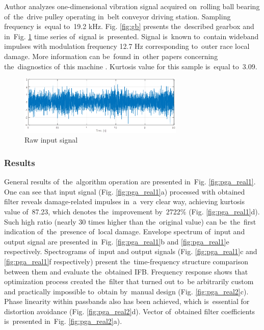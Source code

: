 Author analyzes one-dimensional vibration signal acquired on~rolling ball bearing of~the~drive pulley operating in~belt conveyor driving station. Sampling frequency is~equal to~19.2 kHz. Fig. \ref{fig:gb} presents the~described gearbox and in~Fig. \ref{fig:pga_raw} time series of~signal is~presented. Signal is~known to~contain wideband impulses with modulation frequency 12.7 Hz corresponding to~outer race local damage. More information can be~found in~other papers concerning the~diagnostics of~this machine \cite{zimroz2009some}. Kurtosis value for this sample is~equal to~3.09.

\begin{figure}[ht!]
\centering
\includegraphics[width=0.7\textwidth]{wykresy/pga_raw.png}
\caption{Raw input signal}
\label{fig:pga_raw}
\end{figure}

\subsubsection{Results}

General results of~the~algorithm operation are presented in~Fig. \ref{fig:pga_real1}. One can see that input signal (Fig. \ref{fig:pga_real1}a) processed with obtained filter reveals damage-related impulses in~a~very clear way, achieving kurtosis value of~87.23, which denotes the~improvement by~2722$\%$ (Fig. \ref{fig:pga_real1}d). Such high ratio (nearly 30 times higher than the~original value) can be~the~first indication of~the~presence of~local damage. Envelope spectrum of~input and output signal are presented in~Fig. \ref{fig:pga_real1}b and \ref{fig:pga_real1}e respectively. Spectrograms of~input and output signals (Fig. \ref{fig:pga_real1}c and \ref{fig:pga_real1}f respectively) present the~time-frequency structure comparison between them and evaluate the~obtained IFB. Frequency response shows that optimization process created the~filter that turned out to~be arbitrarily custom and practically impossible to~obtain by~manual design (Fig. \ref{fig:pga_real2}c). Phase linearity within passbands also has been achieved, which is~essential for distortion avoidance (Fig. \ref{fig:pga_real2}d). Vector of~obtained filter coefficients is~presented in~Fig. \ref{fig:pga_real2}a). 

